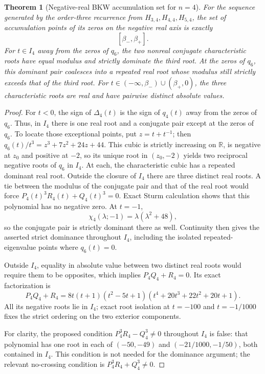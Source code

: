 \documentclass[11pt,a4paper]{article}
\newtheorem{theorem}{Theorem}[section]
\theoremstyle{definition}
\begin{document}
\begin{theorem}[Negative-real BKW accumulation set for $n=4$]
\label{thm:n4-bkw}
For the sequence generated by the order-three recurrence from
$H_{3,4},H_{4,4},H_{5,4}$, the set of accumulation points of its zeros
on the negative real axis is exactly
\[
[\beta_-,\beta_+].
\]
For $t\in I_4$ away from the zeros of $q_6$, the two nonreal conjugate
characteristic roots have equal modulus and strictly dominate the third
root. At the zeros of $q_6$, this dominant pair coalesces into a
repeated real root whose modulus still strictly exceeds that of the
third root. For
$t\in(-\infty,\beta_-)\cup(\beta_+,0)$, the three characteristic roots
are real and have pairwise distinct absolute values.
\end{theorem}

\begin{proof}
For $t<0$, the sign of $\Delta_4(t)$ is the sign of $q_4(t)$ away from
the zeros of $q_6$. Thus, in $I_4$ there is one real root and a
conjugate pair except at the zeros of $q_6$. To locate those exceptional
points, put $z=t+t^{-1}$; then
$q_6(t)/t^3=z^3+7z^2+24z+44$. This cubic is strictly increasing on
$\mathbb R$, is negative at $z_0$ and positive at $-2$, so its unique
root in $(z_0,-2)$ yields two reciprocal negative roots of $q_6$ in
$I_4$. At each, the characteristic cubic has a repeated dominant real
root. Outside the closure of $I_4$ there are three distinct real roots.
A tie between the modulus of the conjugate pair and that of the
real root would force
$P_4(t)^3R_4(t)+Q_4(t)^3=0$. Exact Sturm calculation shows that this
polynomial has no negative zero. At $t=-1$,
\[
\chi_4(\lambda;-1)=\lambda(\lambda^2+48),
\]
so the conjugate pair is strictly dominant there as well. Continuity
then gives the asserted strict dominance throughout $I_4$, including
the isolated repeated-eigenvalue points where $q_6(t)=0$.

Outside $I_4$, equality in absolute value between two distinct real
roots would require them to be opposites, which implies
$P_4Q_4+R_4=0$. Its exact factorization is
\[
P_4Q_4+R_4
=8t(t+1)(t^2-5t+1)(t^4+20t^3+22t^2+20t+1).
\]
All its negative roots lie in $I_4$; exact root isolation at
$t=-100$ and $t=-1/1000$ fixes the strict ordering on the two exterior
components.

For clarity, the proposed condition
$P_4^3R_4-Q_4^3\ne0$ throughout $I_4$ is false: that polynomial has
one root in each of $(-50,-49)$ and $(-21/1000,-1/50)$, both contained
in $I_4$. This condition is not needed for the dominance argument;
the relevant no-crossing condition is
$P_4^3R_4+Q_4^3\ne0$.


\end{proof}
\end{document}
